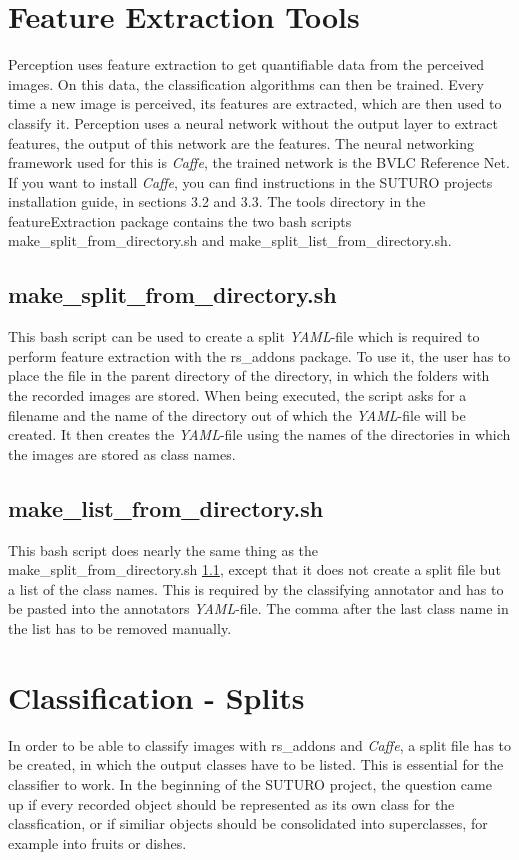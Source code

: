 \documentclass[main.tex]{subfiles}
\begin{document}
\section{Feature Extraction Tools}
Perception uses feature extraction to get quantifiable data from the perceived images. On this data, the classification algorithms can then be trained. Every time a new image is perceived, its features are extracted, which are then used to classify it. Perception uses a neural network without the output layer to extract features, the output of this network are the features. The neural networking framework used for this is \textit{Caffe}, the trained network is the BVLC Reference Net. If you want to install \textit{Caffe}, you can find instructions in the SUTURO projects installation guide, in sections 3.2 and 3.3. The tools directory in the featureExtraction package contains the two bash scripts make\_split\_from\_directory.sh and make\_split\_list\_from\_directory.sh.

\subsection{make\_split\_from\_directory.sh} \label{make_split_from_directory}
This bash script can be used to create a split \textit{YAML}-file which is required to perform feature extraction with the rs\_addons package. To use it, the user has to place the file in the parent directory of the directory, in which the folders with the recorded images are stored. When being executed, the script asks for a filename and the name of the directory out of which the \textit{YAML}-file will be created. It then creates the \textit{YAML}-file using the names of the directories in which the images are stored as class names.

\subsection{make\_list\_from\_directory.sh}
This bash script does nearly the same thing as the make\_split\_from\_directory.sh \ref{make_split_from_directory}, except that it does not create a split file but a list of the class names. This is required by the classifying annotator and has to be pasted into the annotators \textit{YAML}-file. The comma after the last class name in the list has to be removed manually.

\section{Classification - Splits}
In order to be able to classify images with rs\_addons and \textit{Caffe}, a split file has to be created, in which the output classes have to be listed. This is essential for the classifier to work. In the beginning of the SUTURO project, the question came up if every recorded object should be represented as its own class for the classfication, or if similiar objects should be consolidated into superclasses, for example into fruits or dishes.\\
\end{document}
